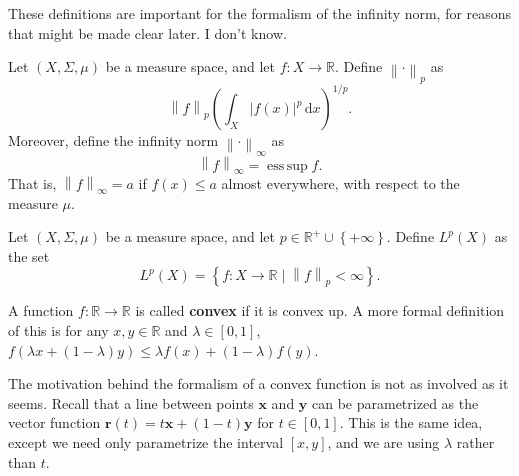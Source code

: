 \documentclass[11pt, letterpaper]{report}
\DeclareMathOperator*{\esssup}{ess\,sup}
\begin{document}
These definitions are important for the formalism of the infinity norm, for reasons that might be made clear later. I don't know.
\begin{definition}[$p$-norm]\label{dfn:2.3}
	Let $(X,\Sigma ,\mu )$ be a measure space, and let $f : X \to \mathbb{R}$. Define $\left\lVert \cdot  \right\rVert _p$ as
	\[
		\left\lVert f \right\rVert _p\left( \int_X \left| f(x) \right| ^p \,\mathrm{d} x \right) ^{1 /p}
	.\]
	Moreover, define the infinity norm $\left\lVert \cdot  \right\rVert _\infty$ as
	\[
		\left\lVert f \right\rVert _{\infty}=\esssup f
	.\]
	That is, $\left\lVert f \right\rVert _\infty=a$ if $f(x)\leq a$ almost everywhere, with respect to the measure $\mu $.
\end{definition}
\begin{definition}[$L^p$-space]\label{dfn:2.4}
	Let $(X,\Sigma ,\mu )$ be a measure space, and let $p\in\mathbb{R}^+\cup\left\{ +\infty \right\} $. Define $L^p(X)$ as the set
	\[
		L^p(X)=\left\{ f : X \to \mathbb{R} \mid \left\lVert f \right\rVert _p<\infty \right\} 
	.\]
\end{definition}
\begin{definition}\label{dfn:2.5}
	A function $f : \mathbb{R} \to \mathbb{R}$ is called \textbf{convex} if it is convex up. A more formal definition of this is for any $x,y\in\mathbb{R}$ and $\lambda \in[0,1]$, $f(\lambda x+\left( 1-\lambda  \right) y)\leq \lambda f(x)+\left( 1-\lambda  \right) f(y)$.
\end{definition}
The motivation behind the formalism of a convex function is not as involved as it seems. Recall that a line between points $\mathbf{x}$ and $\mathbf{y}$ can be parametrized as the vector function $\mathbf{r}(t)=t\mathbf{x}+(1-t)\mathbf{y}$ for $t\in[0,1]$. This is the same idea, except we need only parametrize the interval $[x,y]$, and we are using $\lambda $ rather than $t$.
\end{document}

